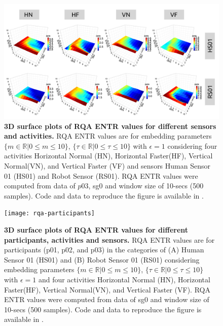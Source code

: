 \documentclass[fleqn,10pt]{wlscirep}
\begin{document}
\begin{figure}[ht]
\centering
\includegraphics[width=1.0\textwidth]{rqa-sensors-activities}
    \caption{
	{\bf 3D surface plots of RQA ENTR values for different sensors and activities.}
	RQA ENTR values are for embedding parameters
	$ \{ m \in \mathbb{R} | 0 \le m \le 10  \}$,
	$ \{ \tau \in \mathbb{R} | 0 \le \tau \le 10  \}$
	with $\epsilon = 1 $ considering four activities 
	Horizontal Normal (HN), Horizontal Faster(HF), Vertical Normal(VN), and 
	Vertical Faster (VF) and sensors Human Sensor 01 (HS01) and 
	Robot Sensor (RS01).
	RQA ENTR values were computed from data of $p03$, sg0 and 
	window size of 10-secs (500 samples).
	Code and data to reproduce the figure is available in \cite{srep2020}.
       }
\label{fig:3dRQAENTR_sensoractivities}
\end{figure}

\begin{figure}[ht]
\centering
\texttt{[image: rqa-participants]}
    \caption{
	{\bf 3D surface plots of RQA ENTR values for different participants, activities and sensors.}
	RQA ENTR values are for participants (p01, p02, and p03) 
	in the categories of 
	(A) Human Sensor 01 (HS01) and 
	(B) Robot Sensor 01 (RS01)
	considering embedding parameters
	$ \{ m \in \mathbb{R} | 0 \le m \le 10  \}$,
	$ \{ \tau \in \mathbb{R} | 0 \le \tau \le 10  \}$
	with $\epsilon = 1$ and four activities 
	Horizontal Normal (HN), Horizontal Faster(HF), Vertical Normal(VN), and 
	Vertical Faster (VF).
	RQA ENTR values were computed from data of sg0 and window size of 10-secs (500 samples).
	Code and data to reproduce the figure is available in \cite{srep2020}.
       }
\label{fig:3dRQAENTR_participantsactivities}
\end{figure}
\end{document}

